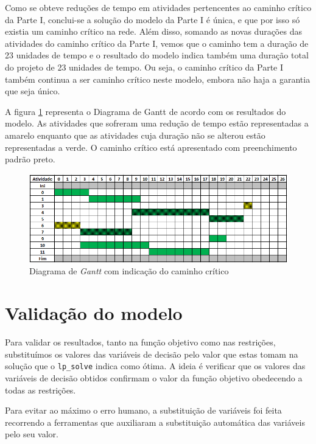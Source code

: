 Como se obteve reduções de tempo em atividades pertencentes ao caminho crítico da Parte I, conclui-se a solução do modelo da Parte I é única, e que por isso só existia um caminho crítico na rede. 
Além disso, somando as novas durações das atividades do caminho crítico da Parte I, vemos que o caminho tem a duração de 23 unidades de tempo e o resultado do modelo indica também uma duração total do projeto de 23 unidades de tempo. Ou seja, o caminho crítico da Parte I também continua a ser caminho crítico neste modelo, embora não haja a garantia que seja único.

A figura \ref{p3:fig:diagrama_gantt} representa o Diagrama de Gantt de acordo com os resultados do modelo. As
atividades que sofreram uma redução de tempo estão representadas a amarelo enquanto
que as atividades cuja duração não se alterou estão representadas a verde.
O caminho crítico está apresentado com preenchimento padrão preto.

\begin{figure}[H]
	\centering
	\includegraphics[scale=0.5]{./img/p3_diagrama_gantt}
	\caption{Diagrama de \emph{Gantt} com indicação do caminho crítico}
\label{p3:fig:diagrama_gantt}
\end{figure}


\section{Validação do modelo}

Para validar os resultados, tanto na função objetivo como nas restrições,
substituímos os valores das variáveis de decisão pelo valor que estas tomam na
solução que o \texttt{lp\_solve} indica como ótima. A ideia é verificar que os valores das
variáveis de decisão obtidos confirmam o valor da função objetivo obedecendo
a todas as restrições.

Para evitar ao máximo o erro humano, a substituição de variáveis foi feita
recorrendo a ferramentas que auxiliaram a substituição automática das variáveis
pelo seu valor.


